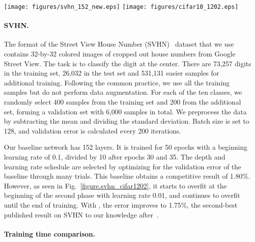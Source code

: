 \documentclass[runningheads]{llncs}
\begin{document}
\begin{figure*}[t]
	\begin{center}
		\centerline{\texttt{[image: figures/svhn\_152\_new.eps]} \texttt{[image: figures/cifar10\_1202.eps]}}
		\caption{Left: Test error on SVHN, corresponding to results on column three in Table~\ref{table.error}. \textit{right}: Test error on CIFAR-10 using 1202-layer ResNets. The points of lowest validation errors are highlighted in each case.}
		\vspace{-8ex}
		\label{figure.svhn_cifar1202}
	\end{center}
\end{figure*}

\paragraph{\textbf{SVHN.}}
The format of the Street View House Number (SVHN)~\cite{netzer2011reading} dataset that we use contains 32-by-32 colored images of cropped out house numbers from Google Street View. The task is to classify the digit at the center. There are 73,257 digits in the training set, 26,032 in the test set and 531,131 easier samples for additional training. Following the common practice, we use all the training samples but do not perform data augmentation. For each of the ten classes, we randomly select 400 samples from the training set and 200 from the additional set, forming a validation set with 6,000 samples in total. We preprocess the data by subtracting the mean and dividing the standard deviation. Batch size is set to 128, and validation error is calculated every 200 iterations.

Our baseline network has 152 layers. It is trained for 50 epochs with a beginning learning rate of 0.1, divided by 10 after epochs 30 and 35. The depth and learning rate schedule are selected by optimizing for the validation error of the baseline through many trials. This baseline obtains a competitive result of 1.80\%. However, as seen in Fig.~\ref{figure.svhn_cifar1202}, it starts to overfit at the beginning of the second phase with learning rate 0.01, and continues to overfit until the end of training. With \name{}, the error improves to 1.75\%, the second-best published result on SVHN to our knowledge after~\cite{lee2015generalizing}.

\paragraph{\textbf{Training time comparison.}}
\end{document}
